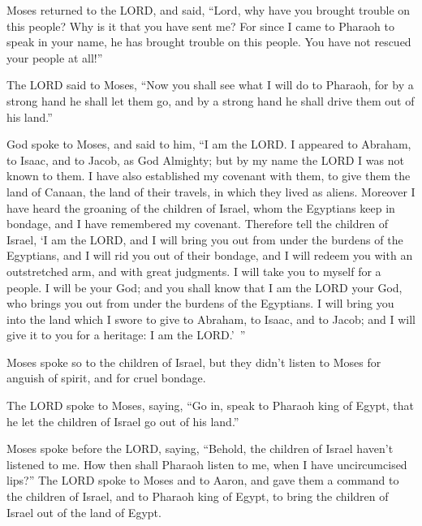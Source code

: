 \myverse{}Moses returned to the LORD, and said, “Lord, why have you brought
trouble on this people? Why is it that you have sent me? \myverse{}For since I came to Pharaoh to speak in your name, he has brought trouble on this people. You have not rescued your people at all!”


\mychapter{} \myverse*{}The LORD said to Moses, “Now you shall see what I will do to Pharaoh, for by a strong hand he shall let them go, and by a strong hand he shall drive them out of his land.”


\myverse{}God spoke to Moses, and said to him, “I am the LORD. \myverse{}I appeared to Abraham, to Isaac, and to Jacob, as God Almighty; but by my name the LORD I was not known to them. \myverse{}I have also established my covenant with them, to give them the land of Canaan, the land of their travels, in which they lived as aliens. \myverse{}Moreover I have heard the groaning of the children of Israel, whom the Egyptians keep in bondage, and I have remembered my covenant. \myverse{}Therefore tell the children of Israel, ‘I am the LORD, and I will bring you out from under the burdens of the Egyptians, and I will rid you out of their bondage, and I will redeem you with an outstretched arm, and with great judgments. \myverse{}I will take you to myself for a people. I will be your God; and you shall know that I am the LORD your God, who brings you out from under the burdens of the Egyptians. \myverse{}I will bring you into the land which I swore to give to Abraham, to Isaac, and to Jacob; and I will give it to you for a heritage: I am the LORD.’ ”


\myverse{}Moses spoke so to the children of Israel, but they didn’t listen
to Moses for anguish of spirit, and for cruel bondage.


\myverse{}The LORD spoke to Moses, saying, \myverse{}“Go in, speak to Pharaoh king of Egypt, that he let the children of Israel go out of his land.”


\myverse{}Moses spoke before the LORD, saying, “Behold, the children of Israel haven’t listened to me. How then shall Pharaoh listen to me, when I have uncircumcised lips?” \myverse{}The LORD spoke to Moses and to Aaron, and gave them a command to the children of Israel, and to Pharaoh king of Egypt, to bring the children of Israel out of the land of Egypt.

